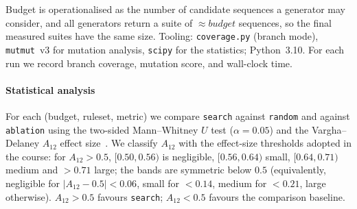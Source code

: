 \documentclass[conference]{IEEEtran}
\begin{document}
Budget is operationalised as the number of candidate sequences a generator may
consider, and all generators return a suite of $\approx\!\mathit{budget}$
sequences, so the final measured suites have the same size. Tooling:
\texttt{coverage.py} (branch mode), \texttt{mutmut}~v3 for mutation analysis,
\texttt{scipy} for the statistics; Python~3.10. For each run we record branch
coverage, mutation score, and wall-clock time.

\paragraph{Statistical analysis}
For each (budget, ruleset, metric) we compare \texttt{search} against
\texttt{random} and against \texttt{ablation} using the two-sided
Mann--Whitney $U$ test ($\alpha=0.05$) and the Vargha--Delaney $A_{12}$ effect
size~\cite{vargha2000critique,arcuri2014hitchhiker}. We classify $A_{12}$ with the
effect-size thresholds adopted in the course: for $A_{12}>0.5$,
$[0.50,0.56)$ is negligible, $[0.56,0.64)$ small, $[0.64,0.71)$ medium and
$>0.71$ large; the bands are symmetric below $0.5$ (equivalently, negligible
for $|A_{12}-0.5|<0.06$, small for $<0.14$, medium for $<0.21$, large
otherwise). $A_{12}>0.5$ favours \texttt{search}; $A_{12}<0.5$ favours the
comparison baseline.
\end{document}
